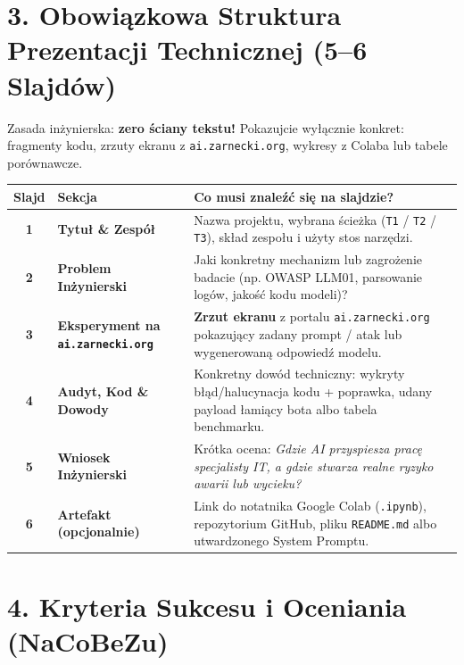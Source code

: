 \documentclass[11pt,a4paper]{article}
\begin{document}
\newpage

\section{3. Obowiązkowa Struktura Prezentacji Technicznej (5--6 Slajdów)}

Zasada inżynierska: \textbf{zero ściany tekstu!} Pokazujcie wyłącznie konkret: fragmenty kodu, zrzuty ekranu z \texttt{ai.zarnecki.org}, wykresy z Colaba lub tabele porównawcze.

\begin{center}
\begin{tabularx}{\textwidth}{@{} c l X @{}}
\toprule
\textbf{Slajd} & \textbf{Sekcja} & \textbf{Co musi znaleźć się na slajdzie?} \\
\midrule
\textbf{1} & \textbf{Tytuł \& Zespół} & Nazwa projektu, wybrana ścieżka (\texttt{T1} / \texttt{T2} / \texttt{T3}), skład zespołu i użyty stos narzędzi. \\
\midrule
\textbf{2} & \textbf{Problem Inżynierski} & Jaki konkretny mechanizm lub zagrożenie badacie (np. OWASP LLM01, parsowanie logów, jakość kodu modeli)? \\
\midrule
\textbf{3} & \textbf{Eksperyment na \texttt{ai.zarnecki.org}} & \textbf{Zrzut ekranu} z portalu \texttt{ai.zarnecki.org} pokazujący zadany prompt / atak lub wygenerowaną odpowiedź modelu. \\
\midrule
\textbf{4} & \textbf{Audyt, Kod \& Dowody} & Konkretny dowód techniczny: wykryty błąd/halucynacja kodu + poprawka, udany payload łamiący bota albo tabela benchmarku. \\
\midrule
\textbf{5} & \textbf{Wniosek Inżynierski} & Krótka ocena: \emph{Gdzie AI przyspiesza pracę specjalisty IT, a gdzie stwarza realne ryzyko awarii lub wycieku?} \\
\midrule
\textbf{6} & \textbf{Artefakt (opcjonalnie)} & Link do notatnika Google Colab (\texttt{.ipynb}), repozytorium GitHub, pliku \texttt{README.md} albo utwardzonego System Promptu. \\
\bottomrule
\end{tabularx}
\end{center}

\section{4. Kryteria Sukcesu i Oceniania (NaCoBeZu)}
\end{document}
